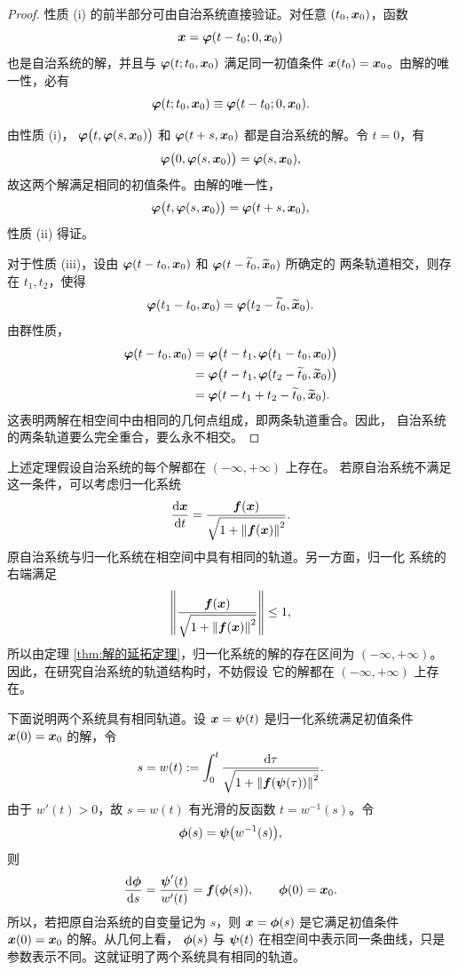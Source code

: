 \begin{proof}
	性质 \textnormal{(i)} 的前半部分可由自治系统直接验证。对任意
	$(t_0,\boldsymbol{x}_0)$，函数
	\[
		\boldsymbol{x}=\boldsymbol{\varphi}(t-t_0;0,\boldsymbol{x}_0)
	\]
	也是自治系统的解，并且与
	$\boldsymbol{\varphi}(t;t_0,\boldsymbol{x}_0)$ 满足同一初值条件
	$\boldsymbol{x}(t_0)=\boldsymbol{x}_0$。由解的唯一性，必有
	\[
		\boldsymbol{\varphi}(t;t_0,\boldsymbol{x}_0)
		\equiv\boldsymbol{\varphi}(t-t_0;0,\boldsymbol{x}_0).
	\]

	由性质 \textnormal{(i)}，
	$\boldsymbol{\varphi}\bigl(t,\boldsymbol{\varphi}(s,\boldsymbol{x}_0)\bigr)$ 和
	$\boldsymbol{\varphi}(t+s,\boldsymbol{x}_0)$ 都是自治系统的解。令 $t=0$，有
	\[
		\boldsymbol{\varphi}\bigl(0,\boldsymbol{\varphi}(s,\boldsymbol{x}_0)\bigr)
		=\boldsymbol{\varphi}(s,\boldsymbol{x}_0),
	\]
	故这两个解满足相同的初值条件。由解的唯一性，
	\[
		\boldsymbol{\varphi}\bigl(t,\boldsymbol{\varphi}(s,\boldsymbol{x}_0)\bigr)
		=\boldsymbol{\varphi}(t+s,\boldsymbol{x}_0),
	\]
	性质 \textnormal{(ii)} 得证。

	对于性质 \textnormal{(iii)}，设由
	$\boldsymbol{\varphi}(t-t_0,\boldsymbol{x}_0)$ 和
	$\boldsymbol{\varphi}(t-\widetilde{t}_0,\widetilde{\boldsymbol{x}}_0)$ 所确定的
	两条轨道相交，则存在 $t_1,t_2$，使得
	\[
		\boldsymbol{\varphi}(t_1-t_0,\boldsymbol{x}_0)
		=\boldsymbol{\varphi}(t_2-\widetilde{t}_0,\widetilde{\boldsymbol{x}}_0).
	\]
	由群性质，
	\begin{align*}
		\boldsymbol{\varphi}(t-t_0,\boldsymbol{x}_0)
		&=\boldsymbol{\varphi}\bigl(
		t-t_1,\boldsymbol{\varphi}(t_1-t_0,\boldsymbol{x}_0)
		\bigr)\\
		&=\boldsymbol{\varphi}\bigl(
		t-t_1,\boldsymbol{\varphi}(t_2-\widetilde{t}_0,
		\widetilde{\boldsymbol{x}}_0)
		\bigr)\\
		&=\boldsymbol{\varphi}
		(t-t_1+t_2-\widetilde{t}_0,\widetilde{\boldsymbol{x}}_0).
	\end{align*}
	这表明两解在相空间中由相同的几何点组成，即两条轨道重合。因此，
	自治系统的两条轨道要么完全重合，要么永不相交。
\end{proof}

上述定理假设自治系统的每个解都在 $(-\infty,+\infty)$ 上存在。
若原自治系统不满足这一条件，可以考虑归一化系统
\[
	\dfrac{\mathrm{d}\boldsymbol{x}}{\mathrm{d} t}
	=\dfrac{\boldsymbol{f}(\boldsymbol{x})}
	{\sqrt{1+\left\| \boldsymbol{f}(\boldsymbol{x}) \right\|^2}}.
\]
原自治系统与归一化系统在相空间中具有相同的轨道。另一方面，归一化
系统的右端满足
\[
	\left\| 
	\dfrac{\boldsymbol{f}(\boldsymbol{x})}
	{\sqrt{1+\left\| \boldsymbol{f}(\boldsymbol{x}) \right\|^2}}
	 \right\|\leq1,
\]
所以由定理 \ref{thm:解的延拓定理}，归一化系统的解的存在区间为
$(-\infty,+\infty)$。因此，在研究自治系统的轨道结构时，不妨假设
它的解都在 $(-\infty,+\infty)$ 上存在。

下面说明两个系统具有相同轨道。设
$\boldsymbol{x}=\boldsymbol{\psi}(t)$ 是归一化系统满足初值条件
$\boldsymbol{x}(0)=\boldsymbol{x}_0$ 的解，令
\[
	s=w(t)\mathrel{:=}
	\int_0^t
	\dfrac{\mathrm{d}\tau}
	{\sqrt{1+\left\| \boldsymbol{f}(\boldsymbol{\psi}(\tau)) \right\|^2}}.
\]
由于 $w'(t)>0$，故 $s=w(t)$ 有光滑的反函数 $t=w^{-1}(s)$。令
\[
	\boldsymbol{\phi}(s)=\boldsymbol{\psi}\bigl(w^{-1}(s)\bigr),
\]
则
\[
	\dfrac{\mathrm{d}\boldsymbol{\phi}}{\mathrm{d} s}
	=\dfrac{\boldsymbol{\psi}'(t)}{w'(t)}
	=\boldsymbol{f}(\boldsymbol{\phi}(s)),
	\qquad
	\boldsymbol{\phi}(0)=\boldsymbol{x}_0.
\]
所以，若把原自治系统的自变量记为 $s$，则
$\boldsymbol{x}=\boldsymbol{\phi}(s)$ 是它满足初值条件
$\boldsymbol{x}(0)=\boldsymbol{x}_0$ 的解。从几何上看，
$\boldsymbol{\phi}(s)$ 与 $\boldsymbol{\psi}(t)$ 在相空间中表示同一条曲线，只是
参数表示不同。这就证明了两个系统具有相同的轨道。


